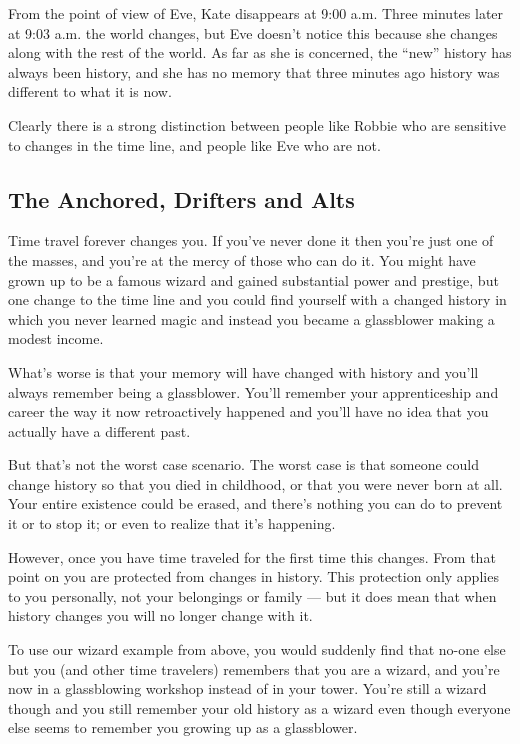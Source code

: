 \begin{multicols*}{2}
From the point of view of Eve, Kate disappears at 9:00 a.m. Three minutes later at 9:03 a.m. the world changes, but Eve doesn’t notice this because she changes along with the rest of the world. As far as she is concerned, the “new” history has always been history, and she has no memory that three minutes ago history was different to what it is now.

Clearly there is a strong distinction between people like Robbie who are sensitive to changes in the time line, and people like Eve who are not.

\subsection{The Anchored, Drifters and Alts}\label{sec:The Anchored, Drifters and Alts}
Time travel forever changes you. If you’ve never done it then you’re just one of the masses, and you’re at the mercy of those who can do it. You might have grown up to be a famous wizard and gained substantial power and prestige, but one change to the time line and you could find yourself with a changed history in which you never learned magic and instead you became a glassblower making a modest income.

What’s worse is that your memory will have changed with history and you’ll always remember being a glassblower. You’ll remember your apprenticeship and career the way it now retroactively happened and you’ll have no idea that you actually have a different past.

But that’s not the worst case scenario. The worst case is that someone could change history so that you died in childhood, or that you were never born at all. Your entire existence could be erased, and there’s nothing you can do to prevent it or to stop it; or even to realize that it’s happening.

However, once you have time traveled for the first time this changes. From that point on you are protected from changes in history. This protection only applies to you personally, not your belongings or family — but it does mean that when history changes you will no longer change with it.

To use our wizard example from above, you would suddenly find that no-one else but you (and other time travelers) remembers that you are a wizard, and you’re now in a glassblowing workshop instead of in your tower. You’re still a wizard though and you still remember your old history as a wizard even though everyone else seems to remember you growing up as a glassblower.


\end{multicols*}
